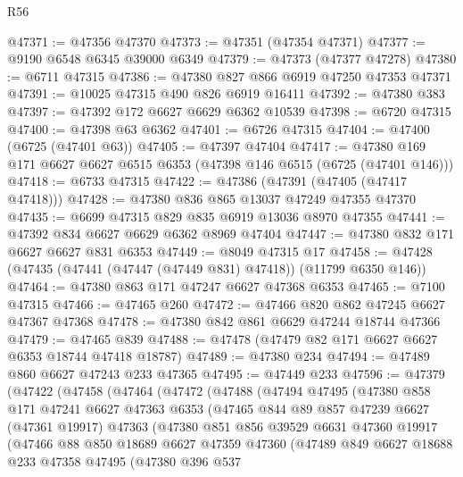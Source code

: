 \begin{lexlean}{R56}
\begin{coremodule}
@47371 := @47356 @47370
@47373 := @47351 (@47354 @47371)
@47377 := @9190 @6548 @6345 @39000 @6349
@47379 := @47373 (@47377 @47278)
@47380 := @6711 @47315
@47386 := @47380 @827 @866 @6919 @47250 @47353 @47371
@47391 := @10025 @47315 @490 @826 @6919 @16411
@47392 := @47380 @383
@47397 := @47392 @172 @6627 @6629 @6362 @10539
@47398 := @6720 @47315
@47400 := @47398 @63 @6362
@47401 := @6726 @47315
@47404 := @47400 (@6725 (@47401 @63))
@47405 := @47397 @47404
@47417 := @47380 @169 @171 @6627 @6627 @6515 @6353 (@47398 @146 @6515 (@6725 (@47401 @146)))
@47418 := @6733 @47315
@47422 := @47386 (@47391 (@47405 (@47417 @47418)))
@47428 := @47380 @836 @865 @13037 @47249 @47355 @47370
@47435 := @6699 @47315 @829 @835 @6919 @13036 @8970 @47355
@47441 := @47392 @834 @6627 @6629 @6362 @8969 @47404
@47447 := @47380 @832 @171 @6627 @6627 @831 @6353
@47449 := @8049 @47315 @17
@47458 := @47428 (@47435 (@47441 (@47447 (@47449 @831) @47418)) (@11799 @6350 @146))
@47464 := @47380 @863 @171 @47247 @6627 @47368 @6353
@47465 := @7100 @47315
@47466 := @47465 @260
@47472 := @47466 @820 @862 @47245 @6627 @47367 @47368
@47478 := @47380 @842 @861 @6629 @47244 @18744 @47366
@47479 := @47465 @839
@47488 := @47478 (@47479 @82 @171 @6627 @6627 @6353 @18744 @47418 @18787)
@47489 := @47380 @234
@47494 := @47489 @860 @6627 @47243 @233 @47365
@47495 := @47449 @233
@47596 := @47379
    (@47422
      (@47458
        (@47464
          (@47472
            (@47488
              (@47494
                @47495
                (@47380
                  @858
                  @171
                  @47241
                  @6627
                  @47363
                  @6353
                  (@47465
                    @844
                    @89
                    @857
                    @47239
                    @6627
                    (@47361 @19917)
                    @47363
                    (@47380
                      @851
                      @856
                      @39529
                      @6631
                      @47360
                      @19917
                      (@47466
                        @88
                        @850
                        @18689
                        @6627
                        @47359
                        @47360
                        (@47489
                          @849
                          @6627
                          @18688
                          @233
                          @47358
                          @47495
                          (@47380
                            @396
                            @537

\end{coremodule}
\end{lexlean}

